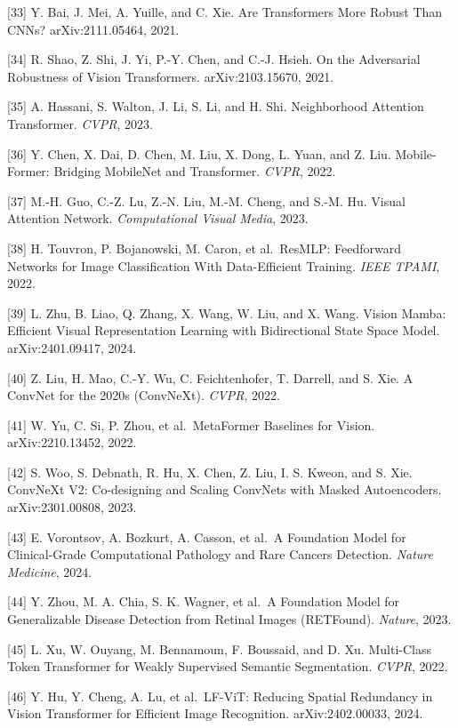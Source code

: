 {[}33{]} Y. Bai, J. Mei, A. Yuille, and C. Xie. Are Transformers More Robust Than CNNs? arXiv:2111.05464, 2021.

{[}34{]} R. Shao, Z. Shi, J. Yi, P.-Y. Chen, and C.-J. Hsieh. On the Adversarial Robustness of Vision Transformers. arXiv:2103.15670, 2021.

{[}35{]} A. Hassani, S. Walton, J. Li, S. Li, and H. Shi. Neighborhood Attention Transformer. \emph{CVPR}, 2023.

{[}36{]} Y. Chen, X. Dai, D. Chen, M. Liu, X. Dong, L. Yuan, and Z. Liu. Mobile-Former: Bridging MobileNet and Transformer. \emph{CVPR}, 2022.

{[}37{]} M.-H. Guo, C.-Z. Lu, Z.-N. Liu, M.-M. Cheng, and S.-M. Hu. Visual Attention Network. \emph{Computational Visual Media}, 2023.

{[}38{]} H. Touvron, P. Bojanowski, M. Caron, et al.~ResMLP: Feedforward Networks for Image Classification With Data-Efficient Training. \emph{IEEE TPAMI}, 2022.

{[}39{]} L. Zhu, B. Liao, Q. Zhang, X. Wang, W. Liu, and X. Wang. Vision Mamba: Efficient Visual Representation Learning with Bidirectional State Space Model. arXiv:2401.09417, 2024.

{[}40{]} Z. Liu, H. Mao, C.-Y. Wu, C. Feichtenhofer, T. Darrell, and S. Xie. A ConvNet for the 2020s (ConvNeXt). \emph{CVPR}, 2022.

{[}41{]} W. Yu, C. Si, P. Zhou, et al.~MetaFormer Baselines for Vision. arXiv:2210.13452, 2022.

{[}42{]} S. Woo, S. Debnath, R. Hu, X. Chen, Z. Liu, I. S. Kweon, and S. Xie. ConvNeXt V2: Co-designing and Scaling ConvNets with Masked Autoencoders. arXiv:2301.00808, 2023.

{[}43{]} E. Vorontsov, A. Bozkurt, A. Casson, et al.~A Foundation Model for Clinical-Grade Computational Pathology and Rare Cancers Detection. \emph{Nature Medicine}, 2024.

{[}44{]} Y. Zhou, M. A. Chia, S. K. Wagner, et al.~A Foundation Model for Generalizable Disease Detection from Retinal Images (RETFound). \emph{Nature}, 2023.

{[}45{]} L. Xu, W. Ouyang, M. Bennamoun, F. Boussaid, and D. Xu. Multi-Class Token Transformer for Weakly Supervised Semantic Segmentation. \emph{CVPR}, 2022.

{[}46{]} Y. Hu, Y. Cheng, A. Lu, et al.~LF-ViT: Reducing Spatial Redundancy in Vision Transformer for Efficient Image Recognition. arXiv:2402.00033, 2024.

